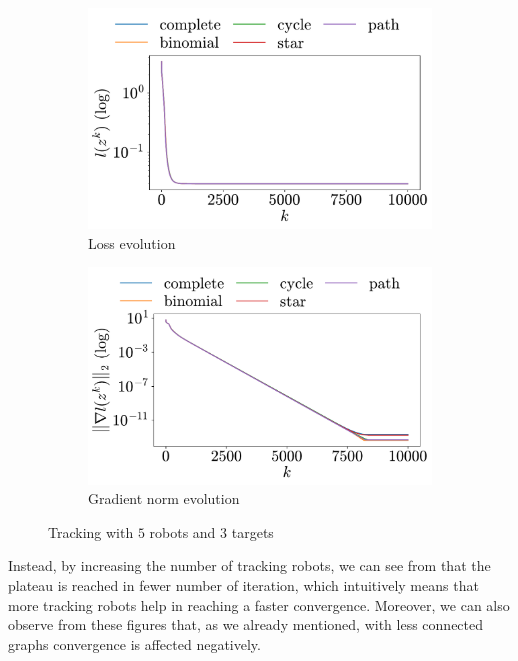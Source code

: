 \documentclass[a4paper,11pt,oneside]{book}
\begin{document}
\begin{figure}[h!]
      \centering
      \begin{subfigure}[h]{0.4\linewidth}
            \centering
            \includegraphics[width=\linewidth]{./figs/tracking/5_3_2/loss.pdf} 
            \caption{Loss evolution}
      \end{subfigure}
      \hfill
      \begin{subfigure}[h]{0.4\linewidth}
            \centering
            \includegraphics[width=\linewidth]{./figs/tracking/5_3_2/gradient.pdf} 
            \caption{Gradient norm evolution}
      \end{subfigure}
      \caption{Tracking with $5$ robots and $3$ targets}
      \label{fig:tracking_5_3}
\end{figure}


Instead, by increasing the number of tracking robots, we can see from  that the plateau is reached in fewer number of iteration, which intuitively means that more tracking robots help in reaching a faster convergence. Moreover, we can also observe from these figures that, as we already mentioned, with less connected graphs convergence is affected negatively.
\end{document}
